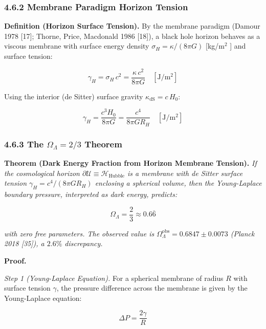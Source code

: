 \documentclass[11pt,a4paper]{article}
\theoremstyle{definition}\newtheorem{definition}{Definition}
\theoremstyle{remark}\newtheorem{remark}{Remark}
\begin{document}
\subsubsection{4.6.2 Membrane Paradigm Horizon Tension}

\textbf{Definition (Horizon Surface Tension).} By the membrane paradigm (Damour 1978 [17]; Thorne, Price, Macdonald 1986 [18]), a black hole horizon behaves as a viscous membrane with surface energy density $\sigma_H = \kappa / (8\pi G)$ [kg/m$^2$ ] and surface tension:


\begin{equation}
\gamma_H = \sigma_H \, c^2 = \frac{\kappa \, c^2}{8\pi G} \quad [\mathrm{J/m^2}]
\end{equation}


Using the interior (de Sitter) surface gravity $\kappa_{\text{dS}} = c \, H_0$:


\begin{equation}
\gamma_H = \frac{c^3 H_0}{8\pi G} = \frac{c^4}{8\pi G R_H} \quad [\mathrm{J/m^2}]
\end{equation}

\subsubsection{4.6.3 The $\Omega_\Lambda = 2/3$ Theorem}

\textbf{Theorem (Dark Energy Fraction from Horizon Membrane Tension).} \textit{If the cosmological horizon $\partial \mathcal{U} \equiv \mathcal{H}_{\text{Hubble}}$ is a membrane with de Sitter surface tension $\gamma_H = c^4/(8\pi G R_H)$ enclosing a spherical volume, then the Young-Laplace boundary pressure, interpreted as dark energy, predicts:}


\begin{equation}
\boxed{\Omega_\Lambda = \frac{2}{3} \approx 0.6\overline{6}}
\end{equation}


\textit{with zero free parameters. The observed value is $\Omega_\Lambda^{\text{obs}} = 0.6847 \pm 0.0073$ (Planck 2018 [35]), a $2.6\%$ discrepancy.}

\textbf{Proof.}

\textit{Step 1 (Young-Laplace Equation).} For a spherical membrane of radius $R$ with surface tension $\gamma$, the pressure difference across the membrane is given by the Young-Laplace equation:


\begin{equation}
\Delta P = \frac{2\gamma}{R}
\end{equation}
\end{document}
